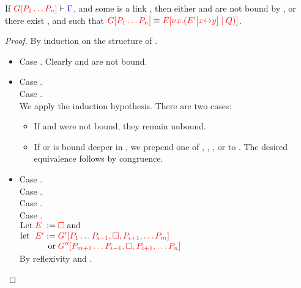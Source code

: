 \begin{lemmaB}\label{thm:cp-progress-link}
  If $\seq[{ \cpPlug{G}{P_1 \dots P_n} }]{ \Gamma }$, and some  is a
  link , then either  and  are not bound by
  , or there exist ,  and  such that
  $\tm{\cpPlug{G}{P_1 \dots P_n}} \equiv
  \tm{\cpPlug{E}{\cpCut{x}{\cpPlug{E'}{\cpLink{x}{y}}}{Q}}}$. 
\end{lemmaB}
\begin{proof}
  By induction on the structure of .
  \begin{itemize}
  \item
    Case \tm{\Box}. Clearly  and  are not bound.
  \item
    Case .\\
    Case .\\
    We apply the induction hypothesis. There are two cases:
    \begin{itemize}
    \item
      If  and  were not bound, they remain unbound.
    \item
      If  or  is bound deeper in , we prepend one of
      ,
      ,
      , or
       to .
      The desired equivalence follows by congruence.
    \end{itemize}
  \item
    Case .\\
    Case .\\
    Case .\\
    Case .
    \\
    \(\arraycolsep=0pt\begin{array}[t]{llrl}
      \text{Let} & \; \tm{E}  &\; :=     &\; \tm{\Box} \; \text{and} \\
      \text{let} & \; \tm{E'} &\; :=     &\; \tm{\cpPlug{G'}{P_1 \dots P_{i-1}, \Box, P_{i+1}, \dots P_m}} \\
                 &            &\text{or} &\; \tm{\cpPlug{G''}{P_{m+1} \dots P_{i-1}, \Box, P_{i+1}, \dots P_n}}
    \end{array}\)
    \\[1ex]
    By reflexivity and \cpEquivCutComm.
  \end{itemize}
\end{proof}
